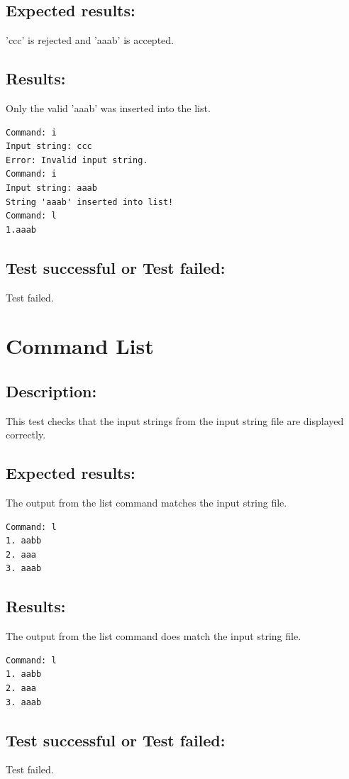\documentclass{report}
\begin{document}
\section{Expected results:} 'ccc' is rejected and 'aaab' is accepted.

\section{Results:} Only the valid 'aaab' was inserted into the list.
\begin{verbatim}
Command: i
Input string: ccc
Error: Invalid input string.
Command: i
Input string: aaab
String 'aaab' inserted into list!
Command: l
1.aaab
\end{verbatim}
\section{Test successful or Test failed:} Test failed.
\pagebreak





\chapter{Command List}
\section{Description:} This test checks that the input strings from the input string file are displayed correctly.

\section{Expected results:} The output from the list command matches the input string file.
\begin{verbatim}
Command: l
1. aabb
2. aaa
3. aaab
\end{verbatim}
\section{Results:} The output from the list command does match the input string file.
\begin{verbatim}
Command: l
1. aabb
2. aaa
3. aaab

\end{verbatim}

\section{Test successful or Test failed:} Test failed.
\pagebreak
\end{document}
